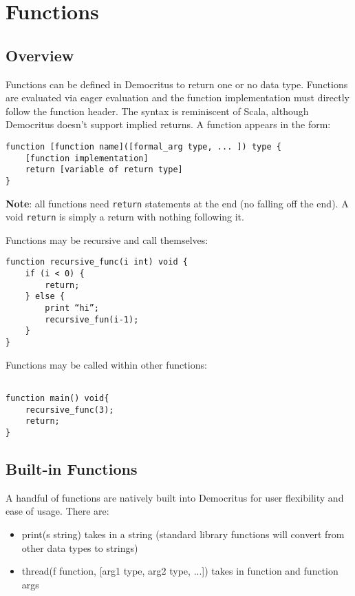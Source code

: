 \section{Functions}
    \subsection{Overview}
        Functions can be defined in Democritus to return one or no data type.  Functions are evaluated via eager evaluation and the function implementation must directly follow the function header. The syntax is reminiscent of Scala, although Democritus doesn't support implied returns.
        \vspace{5mm}
        \noindent A function appears in the form:
        
        \begin{lstlisting}
function [function name]([formal_arg type, ... ]) type {
    [function implementation]
    return [variable of return type]
}
        \end{lstlisting}

        \noindent \textbf{Note}: all functions need \texttt{return} statements at the end (no falling off the end). A void \texttt{return} is simply a return with nothing following it.

        \vspace{5mm}
        \noindent Functions may be recursive and call themselves:

        \begin{lstlisting}
function recursive_func(i int) void {
    if (i < 0) {
        return;
    } else {
        print “hi”;
        recursive_fun(i-1);
    }
}
        \end{lstlisting}


        \noindent Functions may be called within other functions:
        \begin{lstlisting}

function main() void{
    recursive_func(3);
    return;
}
        \end{lstlisting}


    \subsection{Built-in Functions}
        A handful of functions are natively built into Democritus for user flexibility and ease of usage. There are:
        \begin{itemize}
            \item print(s string) takes in a string (standard library functions will convert from other data types to strings)
            \item thread(f function, [arg1 type, arg2 type, ...]) takes in function and function args
        \end{itemize}

